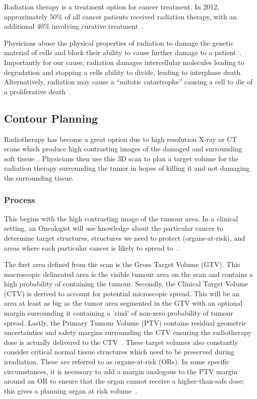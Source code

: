 \documentclass[12pt,twoside]{report}
\begin{document}
Radiation therapy is a treatment option for cancer treatment. In 2012, approximately 50\% of all cancer patients received radiation therapy, with an additional 40\% involving curative treatment~\cite{radiotherapy-advances}. 

Physicians abuse the physical properties of radiation to damage the genetic material of cells and block their ability to cause further damage to a patient~\cite{radiotherapy-advances}. Importantly for our cause, radiation damages intercellular molecules leading to degradation and stopping a cells ability to divide, leading to interphase death. Alternatively, radiation may cause a ``mitotic catastrophe'' causing a cell to die of a proliferative death~\cite{cell-death}. 

\subsection{Contour Planning}\label{sect:contour-planning}

Radiotherapy has become a great option due to high resolution X-ray or CT scans which produce high contrasting images of the damaged and surrounding soft tissue~\cite{radiotherapy-basic-concepts}. Physicians then use this 3D scan to plan a target volume for the radiation therapy surrounding the tumor in hopes of killing it and not damaging the surrounding tissue.

\subsubsection{Process}

This begins with the high contrasting image of the tumour area. In a clinical setting, an Oncologist will use knowledge about the particular cancer to determine target structures, structures we need to protect (organs-at-risk), and areas where each particular cancer is likely to spread to~\cite{AMLART-data}. 

The first area defined from the scan is the Gross Target Volume (GTV). This macroscopic delineated area is the visible tumour area on the scan and contains a high probability of containing the tumour. Secondly, the Clinical Target Volume (CTV) is derived to account for potential microscopic spread. This will be an area at least as big as the tumor area segmented in the GTV with an optional margin surrounding it containing a 'rind' of non-zero probability of tumour spread. Lastly, the Primary Tumour Volume (PTV) contains residual geometric uncertainties and safety margins surrounding the CTV ensuring the radiotherapy dose is actually delivered to the CTV~\cite{tumor-delineation,defining-target-volumes,Lin2021-oz,personalised-PTV-strategies}. These target volumes also constantly consider critical normal tissue structures which need to be preserved during irradiation. These are referred to as organs-at-risk (ORs). In some specific circumstances, it is necessary to add a margin analogous to the PTV margin around an OR to ensure that the organ cannot receive a higher-than-safe dose; this gives a planning organ at risk volume~\cite{defining-target-volumes}.
\end{document}

